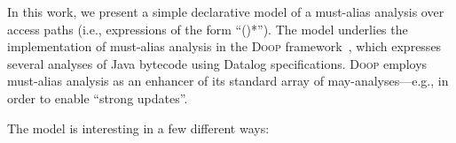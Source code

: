 



In this work, we present a simple declarative model of a must-alias
analysis over access paths (i.e., expressions of the form
``()*'').  The model underlies the implementation
of must-alias analysis in the \textsc{Doop}
framework~\cite{oopsla:2009:Bravenboer}, which expresses several
analyses of Java bytecode using Datalog specifications. \textsc{Doop}
employs must-alias analysis as an enhancer of its standard array of
may-analyses---e.g., in order to enable ``strong updates''.

The model is interesting in a few different ways:

